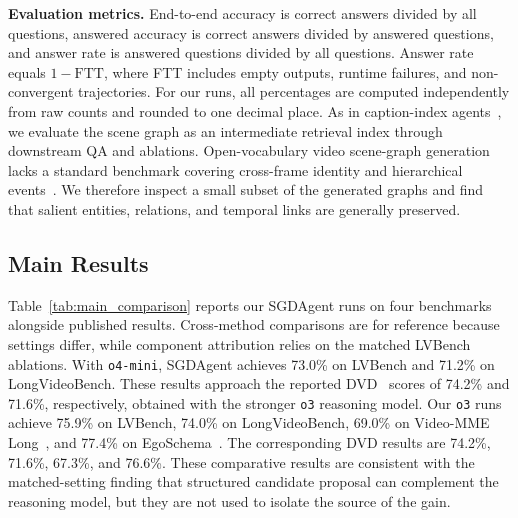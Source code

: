 \documentclass[letterpaper]{article} %
\begin{document}
\textbf{Evaluation metrics.}
End-to-end accuracy is correct answers divided by all questions, answered accuracy is correct answers divided by answered questions, and answer rate is answered questions divided by all questions.
Answer rate equals $1-\mathrm{FTT}$, where FTT includes empty outputs, runtime failures, and non-convergent trajectories.
For our runs, all percentages are computed independently from raw counts and rounded to one decimal place.
As in caption-index agents~\cite{videoagent,deepvideo2025,drvideo2025}, we evaluate the scene graph as an intermediate retrieval index through downstream QA and ablations.
Open-vocabulary video scene-graph generation lacks a standard benchmark covering cross-frame identity and hierarchical events~\cite{frompixel2024,hig2024,hyperglm2025}.
We therefore inspect a small subset of the generated graphs and find that salient entities, relations, and temporal links are generally preserved.



\subsection{Main Results}
\label{sec:results}

Table~\ref{tab:main_comparison} reports our SGDAgent runs on four benchmarks alongside published results.
Cross-method comparisons are for reference because settings differ, while component attribution relies on the matched LVBench ablations.
With \texttt{o4-mini}, SGDAgent achieves 73.0\% on LVBench and 71.2\% on LongVideoBench.
These results approach the reported DVD~\cite{deepvideo2025} scores of 74.2\% and 71.6\%, respectively, obtained with the stronger \texttt{o3} reasoning model.
Our \texttt{o3} runs achieve 75.9\% on LVBench, 74.0\% on LongVideoBench, 69.0\% on Video-MME Long~\cite{videomme2024}, and 77.4\% on EgoSchema~\cite{egoschema2023}.
The corresponding DVD results are 74.2\%, 71.6\%, 67.3\%, and 76.6\%.
These comparative results are consistent with the matched-setting finding that structured candidate proposal can complement the reasoning model, but they are not used to isolate the source of the gain.

\end{document}
